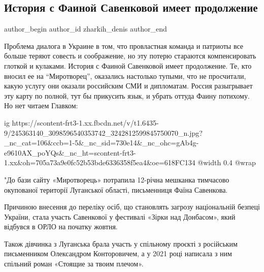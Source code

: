  
 
 
 
 
 
\subsection{История с Фаиной Савенковой имеет продолжение}
\label{sec:13_10_2021.fb.zharkih_denis.4.savenkova_prodolzhenie}
 
\ifcmt
 author_begin
   author_id zharkih_denis
 author_end
\fi

Проблема диалога в Украине в том, что провластная команда и патриоты все больше
теряют совесть и соображение, но эту потерю стараются компенсировать глоткой и
кулаками. История с Фаиной Савенковой имеет продолжение. Те, кто вносил ее на
\enquote{Миротворец}, оказались настолько тупыми, что не просчитали, какую услугу они
оказали российским СМИ и дипломатам. Россия разыгрывает эту карту по полной,
тут бы прикусить язык, и убрать оттуда Фаину потихому. Но нет читаем Главком: 

\ifcmt
  ig https://scontent-frt3-1.xx.fbcdn.net/v/t1.6435-9/245363140_3098596540353742_3242812599845750070_n.jpg?_nc_cat=106&ccb=1-5&_nc_sid=730e14&_nc_ohc=gAb4g-e9610AX_poYQs&_nc_ht=scontent-frt3-1.xx&oh=705a73a9e0fc52b53bde6336358f5ea4&oe=618FC134
  @width 0.4
  @wrap \parpic[r]
\fi

"До бази сайту «Миротворець» потрапила 12-річна мешканка тимчасово окупованої
території Луганської області, письменниця Фаїна Савенкова.

Причиною внесення до переліку осіб, що становлять загрозу національній безпеці
України, стала участь Савенкової у фестивалі «Зірки над Донбасом», який
відбувся в ОРЛО на початку жовтня.

Також дівчинка з Луганська брала участь у спільному проєкті з російським
письменником Олександром Конторовичем, а у 2021 році написала з ним спільний
роман «Стоящие за твоим плечом».

